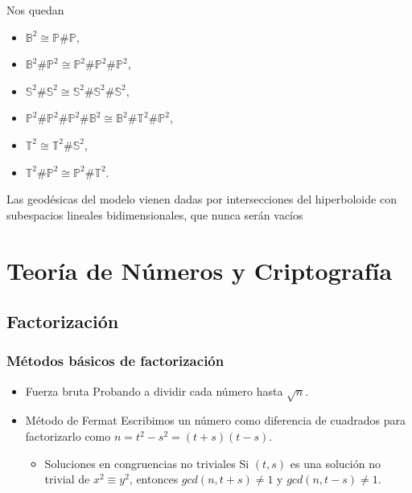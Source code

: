 \documentclass[11pt]{article}
\begin{document}
\begin{itemize}
\begin{enumerate}
Nos quedan

\begin{itemize}
\item $\mathbb{B}^2 \cong \mathbb{P}\#\mathbb{P}$,
\item $\mathbb{B}^2 \#\mathbb{P}^2 \cong \mathbb{P}^2 \# \mathbb{P}^2 \# \mathbb{P}^2$,
\item $\mathbb{S}^2\# \mathbb{S}^2 \cong \mathbb{S}^2 \# \mathbb{S}^2 \# \mathbb{S}^2$,
\item $\mathbb{P}^2\#\mathbb{P}^2\#\mathbb{P}^2\#\mathbb{B}^2 \cong \mathbb{B}^2\#\mathbb{T}^2\#\mathbb{P}^2$,
\item $\mathbb{T}^2 \cong \mathbb{T}^2\#\mathbb{S}^2$,
\item $\mathbb{T}^2\#\mathbb{P}^2 \cong \mathbb{P}^2\#\mathbb{T}^2$.
\end{itemize}
\end{enumerate}


Las geodésicas del modelo vienen dadas por intersecciones del hiperboloide
con subespacios lineales bidimensionales, que nunca serán vacíos
\end{itemize}
\section*{Teoría de Números y Criptografía}
\label{sec-6}
\subsection*{Factorización}
\label{sec-6-1}
\subsubsection*{Métodos básicos de factorización}
\label{sec-6-1-1}
\begin{itemize}
\item Fuerza bruta
\label{sec-6-1-1-1}
Probando a dividir cada número hasta $\sqrt{n}$.

\item Método de Fermat
\label{sec-6-1-1-2}
Escribimos un número como diferencia de cuadrados para factorizarlo como
$n = t^2 - s^2 = (t+s)(t-s)$.

\begin{itemize}
\item Soluciones en congruencias no triviales
\label{sec-6-1-1-2-1}
Si $(t,s)$ es una solución no trivial de $x^2 \equiv y^2$, entonces $gcd(n,t+s)\neq 1$
y $gcd(n,t-s) \neq 1$.
\end{itemize}
\end{itemize}
\end{document}

